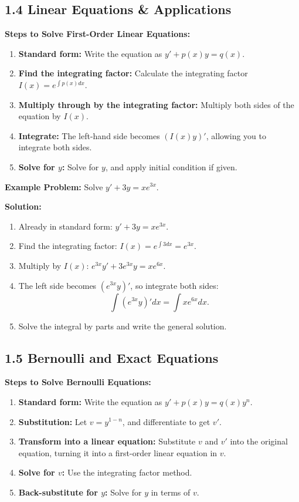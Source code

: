\documentclass[10pt]{article}
\begin{document}
\subsection*{1.4 Linear Equations \& Applications}
\textbf{Steps to Solve First-Order Linear Equations:}
\begin{enumerate}
    \item \textbf{Standard form:} Write the equation as \( y' + p(x)y = q(x) \).
    \item \textbf{Find the integrating factor:} Calculate the integrating factor \( I(x) = e^{\int p(x) dx} \).
    \item \textbf{Multiply through by the integrating factor:} Multiply both sides of the equation by \( I(x) \).
    \item \textbf{Integrate:} The left-hand side becomes \( (I(x) y)' \), allowing you to integrate both sides.
    \item \textbf{Solve for \( y \):} Solve for \( y \), and apply initial condition if given.
\end{enumerate}

\textbf{Example Problem:} Solve \( y' + 3y = x e^{3x} \).

\textbf{Solution:}
\begin{enumerate}
    \item Already in standard form: \( y' + 3y = x e^{3x} \).
    \item Find the integrating factor: \( I(x) = e^{\int 3 dx} = e^{3x} \).
    \item Multiply by \( I(x) \): \( e^{3x} y' + 3e^{3x} y = x e^{6x} \).
    \item The left side becomes \( (e^{3x} y)' \), so integrate both sides:
    \[
    \int (e^{3x} y)' dx = \int x e^{6x} dx.
    \]
    \item Solve the integral by parts and write the general solution.
\end{enumerate}

\subsection*{1.5 Bernoulli and Exact Equations}
\textbf{Steps to Solve Bernoulli Equations:}
\begin{enumerate}
    \item \textbf{Standard form:} Write the equation as \( y' + p(x)y = q(x) y^n \).
    \item \textbf{Substitution:} Let \( v = y^{1-n} \), and differentiate to get \( v' \).
    \item \textbf{Transform into a linear equation:} Substitute \( v \) and \( v' \) into the original equation, turning it into a first-order linear equation in \( v \).
    \item \textbf{Solve for \( v \):} Use the integrating factor method.
    \item \textbf{Back-substitute for \( y \):} Solve for \( y \) in terms of \( v \).
\end{enumerate}
\end{document}

